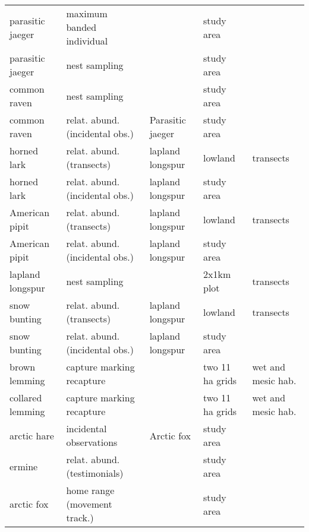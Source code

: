 \begin{table}[H]
\begin{tabularx}{\textwidth}{lllll}
  parasitic jaeger & maximum banded individual &  & study area &  \\ 
  parasitic jaeger & nest sampling &  & study area &  \\ 
  common raven & nest sampling &  & study area &  \\ 
  common raven & relat. abund. (incidental obs.) & Parasitic jaeger & study area &  \\ 
  horned lark & relat. abund. (transects) & lapland longspur & lowland & transects \\ 
  horned lark & relat. abund. (incidental obs.) & lapland longspur & study area &  \\ 
  American pipit & relat. abund. (transects) & lapland longspur & lowland & transects \\ 
  American pipit & relat. abund. (incidental obs.) & lapland longspur & study area &  \\ 
  lapland longspur & nest sampling &  & 2x1km plot & transects \\ 
  snow bunting & relat. abund. (transects) & lapland longspur & lowland & transects \\ 
  snow bunting & relat. abund. (incidental obs.) & lapland longspur & study area &  \\ 
  brown lemming & capture marking recapture &  & two 11 ha grids & wet and mesic hab. \\ 
  collared lemming & capture marking recapture &  & two 11 ha grids & wet and mesic hab. \\ 
  arctic hare & incidental observations & Arctic fox & study area &  \\ 
  ermine & relat. abund. (testimonials) &  & study area &  \\ 
  arctic fox & home range (movement track.) &  & study area &  \\ 
   \hline
\end{tabularx}
\endgroup
\end{table}
